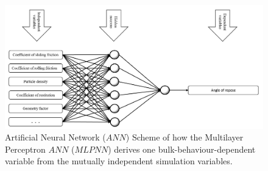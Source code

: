 \begin{figure}[!htb]
\centering
\includegraphics[width=.96\columnwidth]{images/018nnscheme}
\caption[ANN Scheme]{Artificial Neural Network ($ANN$) Scheme
of how the Multilayer Perceptron $ANN$ ($MLPNN$) derives one
bulk-behaviour-dependent variable from the mutually independent simulation variables.}
\label{fig:018nnscheme}
\end{figure}